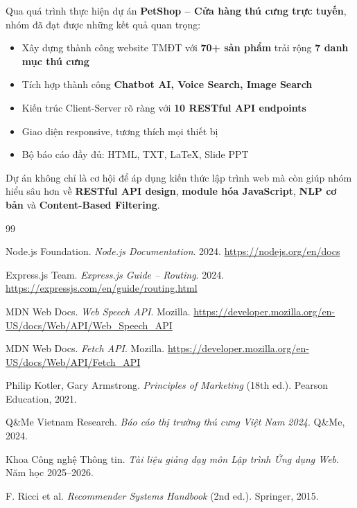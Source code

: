 \documentclass[12pt, a4paper]{report}
\begin{document}
Qua quá trình thực hiện dự án \textbf{PetShop – Cửa hàng thú cưng trực tuyến}, nhóm đã đạt được những kết quả quan trọng:

\begin{successbox}
\begin{itemize}
    \item Xây dựng thành công website TMĐT với \textbf{70+ sản phẩm} trải rộng \textbf{7 danh mục thú cưng}
    \item Tích hợp thành công \textbf{Chatbot AI, Voice Search, Image Search}
    \item Kiến trúc Client-Server rõ ràng với \textbf{10 RESTful API endpoints}
    \item Giao diện responsive, tương thích mọi thiết bị
    \item Bộ báo cáo đầy đủ: HTML, TXT, LaTeX, Slide PPT
\end{itemize}
\end{successbox}

Dự án không chỉ là cơ hội để áp dụng kiến thức lập trình web mà còn giúp nhóm hiểu sâu hơn về \textbf{RESTful API design}, \textbf{module hóa JavaScript}, \textbf{NLP cơ bản} và \textbf{Content-Based Filtering}.

\begin{thebibliography}{99}

 Node.js Foundation. \textit{Node.js Documentation}. 2024. \url{https://nodejs.org/en/docs}

 Express.js Team. \textit{Express.js Guide – Routing}. 2024. \url{https://expressjs.com/en/guide/routing.html}

 MDN Web Docs. \textit{Web Speech API}. Mozilla. \url{https://developer.mozilla.org/en-US/docs/Web/API/Web_Speech_API}

 MDN Web Docs. \textit{Fetch API}. Mozilla. \url{https://developer.mozilla.org/en-US/docs/Web/API/Fetch_API}

 Philip Kotler, Gary Armstrong. \textit{Principles of Marketing} (18th ed.). Pearson Education, 2021.

 Q\&Me Vietnam Research. \textit{Báo cáo thị trường thú cưng Việt Nam 2024}. Q\&Me, 2024.

 Khoa Công nghệ Thông tin. \textit{Tài liệu giảng dạy môn Lập trình Ứng dụng Web}. Năm học 2025--2026.

 F. Ricci et al. \textit{Recommender Systems Handbook} (2nd ed.). Springer, 2015.

\end{thebibliography}
\end{document}
